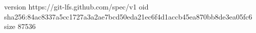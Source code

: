 version https://git-lfs.github.com/spec/v1
oid sha256:84ac8337a5cc1727a3a2ae7bcd50eda21ec6f4d1accb45ea870bb8de3ea05fc6
size 87536
